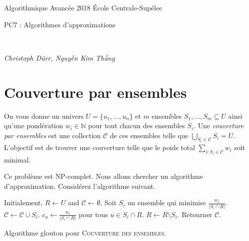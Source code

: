 \documentclass[12pt]{article}
\newcommand{\MakeScribeTop}[1]{
\noindent
\begin{framed}
\noindent
 Algorithmique Avancée 2018
 \hfill
 École Centrale-Supélec
 \\[1em]
 \centerline{ \Large
#1
 }
 \\[1em]
\centerline{  \it Christoph Dürr, Nguyễn Kim Thắng}
\end{framed}
}
\begin{document}
    \MakeScribeTop{PC7 : Algorithmes d'approximations}



\section{Couverture par ensembles}

\begin{figwindow}
On vous donne un univers $U = \{u_{1}, \ldots, u_{n}\}$ et $m$ ensembles 
$S_{1}, \ldots, S_{m}\subseteq U$ ainsi qu'une pondération $w_{i}\in \mathbb N$ pour tout chacun des ensembles $S_i$.
Une \emph{couverture par ensembles} est une collection $\mathcal{C}$ de
ces ensembles telle que $\bigcup_{S_{i} \in \mathcal{C}} S_{i} = U$. 
L'objectif est de trouver une couverture telle que le poids total 
$\sum_{i:S_{i} \in \mathcal{C}} w_{i}$ soit minimal.	

Ce problème est NP-complet. Nous allons chercher un algorithme d'approximation.
Considérez l'algorithme suivant.
\end{figwindow}

\vspace{1cm}


\begin{algorithm}[ht]
\begin{algorithmic}[1]  
\STATE Initialement, $R \gets U$ and $\mathcal{C} \gets \emptyset$. 
	\STATE Soit $S_{i}$ un ensemble qui minimise $\frac{w_{i}}{|S_{i} \cap R|}$.
	\STATE $\mathcal{C} \gets \mathcal{C} \cup S_{i}$.
	\STATE $c_{u} \gets \frac{w_{i}}{|S_{i} \cap R|}$ pour tous $u \in S_{i} \cap R$. 
	\STATE $R \gets R \setminus S_{i}$.
\ENDWHILE
\STATE Retourner $\mathcal{C}$.
\end{algorithmic}
\caption{Algorithme glouton pour \textsc{Couverture des ensembles}.}
\label{algo:covering}
\end{algorithm}
\end{document}
